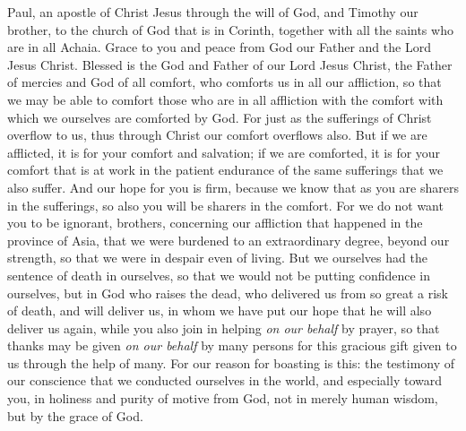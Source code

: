 
\begin{biblechapter} %
 Paul, an apostle of Christ Jesus through the will of God, and Timothy our brother, to the church of God that is in Corinth, together with all the saints who are in all Achaia.
\verse Grace to you and peace from God our Father and the Lord Jesus Christ.
 Blessed is the God and Father of our Lord Jesus Christ, the Father of mercies and God of all comfort,
\verse who comforts us in all our affliction, so that we may be able to comfort those who are in all affliction with the comfort with which we ourselves are comforted by God.
\verse For just as the sufferings of Christ overflow to us, thus through Christ our comfort overflows also.
\verse But if we are afflicted, it is for your comfort and salvation; if we are comforted, it is for your comfort that is at work in the patient endurance of the same sufferings that we also suffer.
\verse And our hope for you is firm, because we know that as you are sharers in the sufferings, so also you will be sharers in the comfort.
\verse For we do not want you to be ignorant, brothers, concerning our affliction that happened in the province of Asia, that we were burdened to an extraordinary degree, beyond our strength, so that we were in despair even of living.
\verse But we ourselves had the sentence of death in ourselves, so that we would not be putting confidence in ourselves, but in God who raises the dead,
\verse who delivered us from so great a risk of death, and will deliver us, in whom we have put our hope that he will also deliver us again,
\verse while you also join in helping \textit{on our behalf} by prayer, so that thanks may be given \textit{on our behalf} by many persons for this gracious gift given to us through the help of many.
 For our reason for boasting is this: the testimony of our conscience that we conducted ourselves in the world, and especially toward you, in holiness and purity of motive from God, not in merely human wisdom, but by the grace of God.

\end{biblechapter}
